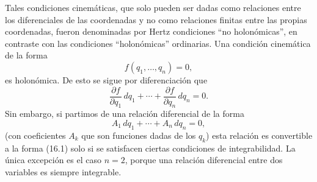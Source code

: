 \documentclass[12pt,a4paper]{book}
\begin{document}
\begin{center}
Tales condiciones cinem\'aticas, que solo pueden ser dadas como relaciones entre los diferenciales de las coordenadas y no como relaciones finitas entre las propias coordenadas, fueron denominadas por Hertz condiciones ``no holon\'omicas'', en contraste con las condiciones ``holon\'omicas'' ordinarias. Una condici\'on cinem\'atica de la forma
\begin{equation}
f(q_1, \ldots, q_n) = 0,
\tag{16.1}
\end{equation}
es holon\'omica. De esto se sigue por diferenciaci\'on que
\begin{equation}
\frac{\partial f}{\partial q_1}\,dq_1 + \cdots + \frac{\partial f}{\partial q_n}\,dq_n = 0.
\tag{16.2}
\end{equation}
Sin embargo, si partimos de una relaci\'on diferencial de la forma
\begin{equation}
A_1\,dq_1 + \cdots + A_n\,dq_n = 0,
\tag{16.3}
\end{equation}
(con coeficientes $A_k$ que son funciones dadas de los $q_k$) esta relaci\'on es convertible a la forma (16.1) solo si se satisfacen ciertas condiciones de integrabilidad. La \'unica excepci\'on es el caso $n = 2$, porque una relaci\'on diferencial entre dos variables es siempre integrable.


\end{center}
\end{document}

